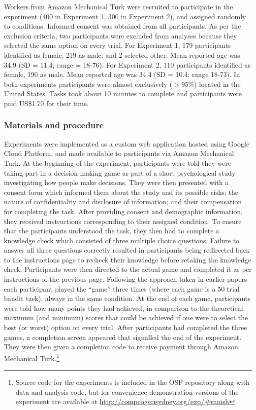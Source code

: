 \documentclass[a4paper,doc,natbib]{apa6}
\begin{document}
Workers from Amazon Mechanical Turk were recruited to participate in the experiment (400 in Experiment 1, 300 in Experiment 2), and assigned randomly to conditions. Informed consent was obtained from all participants. As per the exclusion criteria, two participants were excluded from analyses because they selected the same option on every trial. For Experiment 1, 179 participants identified as female, 219 as male, and 2 selected other. Mean reported age was 34.9 (SD = 11.4; range = 18-76). For Experiment 2, 110 participants identified as female, 190 as male. Mean reported age was 34.4 (SD = 10.4; range 18-73). In both experiments participants were almost exclusively ($>$95\%) located in the United States. Tasks took about 10 minutes to complete and participants were paid US\$1.70 for their time.

\subsubsection{Materials and procedure}

Experiments were implemented as a custom web application hosted using Google Cloud Platform, and made available to participants via Amazon Mechanical Turk. At the beginning of the experiment, participants were told they were taking part in a decision-making game as part of a short psychological study investigating how people make decisions. They were then presented with a consent form which informed them about the study and its possible risks; the nature of confidentiality and disclosure of information; and their compensation for completing the task. After providing consent and demographic information, they received instructions corresponding to their assigned condition. To ensure that the participants understood the task, they then had to complete a knowledge check which consisted of three multiple choice questions. Failure to answer all three questions correctly resulted in participants being redirected back to the instructions page to recheck their knowledge before retaking the knowledge check. Participants were then directed to the actual game and completed it as per instructions of the previous page. Following the approach taken in earlier papers \citep{navarro2016learning,HotalingNN_skilledcogsci} each participant played the ``game'' three times (where each game is a 50 trial bandit task), always in the same condition. At the end of each game, participants were told how many points they had achieved, in comparison to the theoretical maximum (and minimum) scores that could be achieved if one were to select the best (or worst) option on every trial. After participants had completed the three games, a completion screen appeared that signalled the  end of the experiment. They were then given a completion code to receive payment through Amazon Mechanical Turk.\footnote{Source code for the experiments is included in the OSF repository along with data and analysis code, but for convenience demonstration versions of the experiment are available at \url{http://compcogscisydney.org/exp/\#vanish}}
\end{document}
